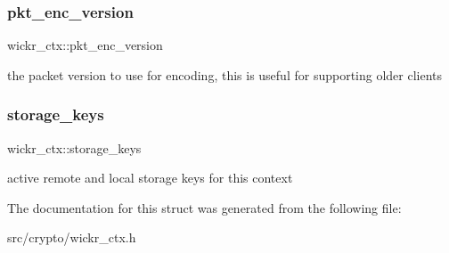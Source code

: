 \subsubsection{\texorpdfstring{pkt\+\_\+enc\+\_\+version}{pkt\_enc\_version}}
{\footnotesize\ttfamily wickr\+\_\+ctx\+::pkt\+\_\+enc\+\_\+version}

the packet version to use for encoding, this is useful for supporting older clients \mbox{\label{structwickr__ctx_ab6d3ad69a6a16c0f582186b9d8461b66}} 
\subsubsection{\texorpdfstring{storage\+\_\+keys}{storage\_keys}}
{\footnotesize\ttfamily wickr\+\_\+ctx\+::storage\+\_\+keys}

active remote and local storage keys for this context 

The documentation for this struct was generated from the following file\+:\begin{DoxyCompactItemize}
\item 
src/crypto/wickr\+\_\+ctx.\+h\end{DoxyCompactItemize}
